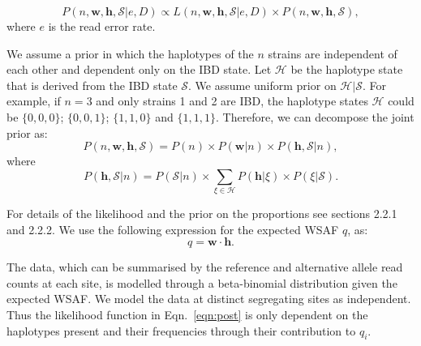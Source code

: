 \documentclass[9pt,lineno]{elife}
\begin{document}
\begin{equation}
P(n, \mathbf{w}, \mathbf{h}, \mathcal{S}| e, D) \propto L(n, \mathbf{w}, \mathbf{h}, \mathcal{S} | e, D) \times P(n, \mathbf{w}, \mathbf{h}, \mathcal{S}), \label{eqn:post}
\end{equation}
where $e$ is the read error rate.

\noindent We assume a prior in which the haplotypes of the $n$ strains are independent of each other and dependent only on the IBD state. Let $\mathcal{H}$ be the haplotype state that is derived from the IBD state $\mathcal{S}$. We assume uniform prior on $\mathcal{H}|\mathcal{S}$. For example, if $n=3$ and only strains 1 and 2 are IBD, the haplotype states $\mathcal{H}$ could be $\{0,0,0\}$; $\{0,0,1\}$; $\{1,1,0\}$ and $\{1,1,1\}$. Therefore, we can decompose the joint prior as:
\begin{equation}
P(n, \mathbf{w}, \mathbf{h}, \mathcal{S}) = P(n) \times P(\mathbf{w}|n) \times P(\mathbf{h} , \mathcal{S}|n),
\end{equation}
where
\begin{equation}
P(\mathbf{h}, \mathcal{S}|n) = P(\mathcal{S}|n) \times \sum_{\xi \in \mathcal{H}} P(\mathbf{h} | \xi) \times P(\xi|\mathcal{S}).
\label{eqn:}
\end{equation}


\noindent For details of the likelihood and the prior on the proportions see \citet{Zhu2017} sections 2.2.1 and 2.2.2. We use the following expression for the expected WSAF $q$, as:
\begin{equation}
q = \mathbf{w}\cdot\mathbf{h}.\label{eqn:qij_full_sum}
\end{equation}



\noindent The data, which can be summarised by the reference and alternative allele read counts at each site, is modelled through a beta-binomial distribution given the expected WSAF.  We model the data at distinct segregating sites as independent.  Thus the likelihood function  in Eqn.~\eqref{eqn:post} is only dependent on the haplotypes present and their frequencies through their contribution to $q_{i}$.
\end{document}
